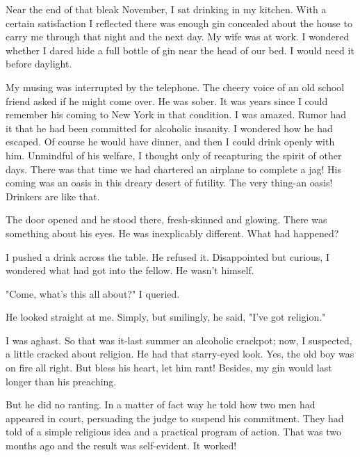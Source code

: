 \begin{biblechapter}
    Near the end of that bleak November, 
    I sat drinking in my kitchen.
\verse With a certain satisfaction I reflected 
    there was enough gin concealed about the house to carry me through that night and the next day.
\verse My wife was at work.
\verse I wondered whether I dared hide a full bottle of gin near the head of our bed.
\verse I would need it before daylight.

\verse My musing was interrupted by the telephone.
\verse The cheery voice of an old school friend asked if he might come over.
\verse He was sober.
\verse It was years since I could remember his coming to New York in that condition.
\verse I was amazed.
\verse Rumor had it that he had been committed for alcoholic insanity.
\verse I wondered how he had escaped.
\verse Of course he would have dinner, 
    and then I could drink openly with him.
\verse Unmindful of his welfare, 
    I thought only of recapturing the spirit of other days.
\verse There was that time we had chartered an airplane to complete a jag!
\verse His coming was an oasis in this dreary desert of futility.
\verse The very thing-an oasis!
\verse Drinkers are like that.

\verse The door opened and he stood there, fresh-skinned and glowing.
\verse There was something about his eyes.
\verse He was inexplicably different.
\verse What had happened?

\verse I pushed a drink across the table.
\verse He refused it.
\verse Disappointed but curious, I wondered what had got into the fellow.
\verse He wasn't himself.

\verse "Come, what's this all about?" I queried.

\verse He looked straight at me.
\verse Simply, but smilingly, he said, "I've got religion."

\verse I was aghast.
\verse So that was it-last summer an alcoholic crackpot; 
    now, I suspected, a little cracked about religion.
\verse He had that starry-eyed look.
\verse Yes, the old boy was on fire all right.
\verse But bless his heart, let him rant!
\verse Besides, my gin would last longer than his preaching.

\verse But he did no ranting.
\verse In a matter of fact way he told how two men had appeared in court, 
    persuading the judge to suspend his commitment.
\verse They had told of a simple religious idea and a practical program of action.
\verse That was two months ago and the result was self-evident.
\verse It worked!


\end{biblechapter}
